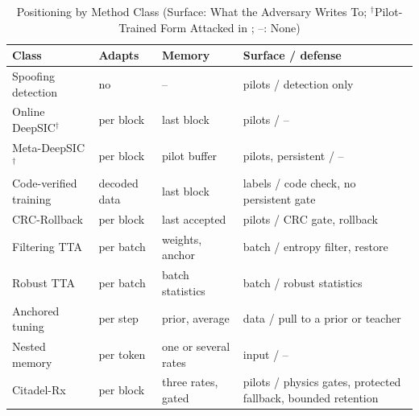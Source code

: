 \documentclass[journal]{IEEEtran}
\theoremstyle{remark}
\begin{document}
\begin{table}[t]
\centering
\caption{Positioning by Method Class (Surface: What the Adversary Writes
To; $^\dagger$Pilot-Trained Form Attacked in \cite{wu2024}; --: None)}\label{tab:pos}
\scriptsize
\begin{tabular}{@{}L{25mm}L{11mm}L{14mm}L{30mm}@{}}
\toprule
Class & Adapts & Memory & Surface / defense\\
\midrule
Spoofing detection \cite{kapetanovic2013,tugnait2015} & no & -- & pilots / detection only\\
Online DeepSIC$^\dagger$ \cite{shlezinger2021} & per block & last block & pilots / --\\
Meta-DeepSIC$^\dagger$ \cite{raviv2023} & per block & pilot buffer & pilots, persistent / --\\
Code-verified training \cite{viterbinet2020,schibisch2018} & decoded data & last block & labels / code check, no persistent gate\\
CRC-Rollback & per block & last accepted & pilots / CRC gate, rollback\\
Filtering TTA \cite{eata2022,cotta2022,sar2023,rotta2023} & per batch & weights, anchor & batch / entropy filter, restore\\
Robust TTA \cite{wu2023tta,medbn} & per batch & batch statistics & batch / robust statistics\\
Anchored tuning \cite{l2sp2018,ewc2017,meanteacher2017} & per step & prior, average & data / pull to a prior or teacher\\
Nested memory \cite{behrouz2025nested,behrouz2025titans} & per token & one or several rates & input / --\\
Citadel-Rx & per block & three rates, gated & pilots / physics gates, protected fallback, bounded retention\\
\bottomrule
\end{tabular}
\end{table}
\end{document}
